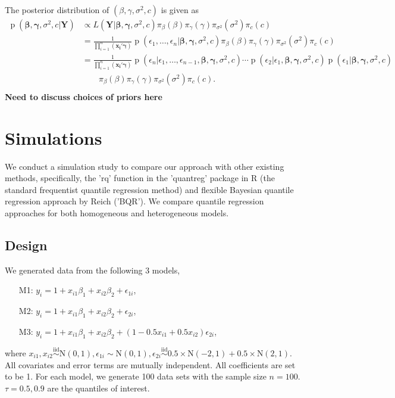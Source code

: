 \documentclass[12pt]{article}
\DeclareMathOperator{\pr}{p}
\begin{document}
The posterior distribution of $(\beta,
\gamma, \sigma^2, c)$ is given as
\begin{align*}
  \pr(\bm{\beta}, \bm{\gamma}, \sigma^2, c|\bm{Y}) & \propto L(\bm{Y}|
  \bm{\beta}, \bm{\gamma}, \sigma^2, c) \pi_{\beta}(\beta)
  \pi_{\gamma}(\gamma) \pi_{\sigma^2}(\sigma^2) \pi_c(c) \\
  & = \frac{1}{\prod_{i=1}^n (\bm{x_i'\gamma})} \pr \left( \epsilon_1,
    \ldots, \epsilon_n | \bm{\beta}, \bm{\gamma}, \sigma^2, c\right)
  \pi_{\beta}(\beta)
  \pi_{\gamma}(\gamma) \pi_{\sigma^2}(\sigma^2) \pi_c(c) \\
  & = \frac{1}{\prod_{i=1}^n (\bm{x_i'\gamma})} \pr \left(\epsilon_n| \epsilon_1,
    \ldots, \epsilon_{n-1} , \bm{\beta}, \bm{\gamma}, \sigma^2, c\right)
  \cdots  \pr \left(\epsilon_2| \epsilon_1, \bm{\beta}, \bm{\gamma},
    \sigma^2, c\right)  \pr \left(\epsilon_1| \bm{\beta}, \bm{\gamma},
    \sigma^2, c\right)\\
  & \qquad 
  \pi_{\beta}(\beta)
  \pi_{\gamma}(\gamma) \pi_{\sigma^2}(\sigma^2) \pi_c(c) .\\
\end{align*}
{\bf Need to discuss choices of priors here}

\section{Simulations}
We
conduct a simulation study to compare our approach with other existing
methods, specifically, the 'rq' function in the 'quantreg' package in
R 
(the standard frequentist quantile regression method) and 
flexible Bayesian quantile regression approach by Reich
('BQR'). 
We compare quantile regression approaches
for both homogeneous and heterogeneous models. 

\subsection{Design}
We generated data from the following 3 models,
\begin{itemize}
\item [M1:] $y_i = 1 + x_{i1}\beta_1 + x_{i2}\beta_2 + \epsilon_{1i}$,
\item [M2:] $y_i = 1 + x_{i1}\beta_1 + x_{i2}\beta_2 + \epsilon_{2i}$,
\item [M3:]  $y_i = 1 + x_{i1}\beta_1 + x_{i2}\beta_2 +
  (1-0.5x_{i1}+0.5x_{i2}) \epsilon_{2i}$, 
\end{itemize}
where $x_{i1} , x_{i2} \stackrel{\text{iid}}{\sim} \mathrm{N}(0,1),
\epsilon_{1i} \sim \mathrm{N}(0,1), \epsilon_{2i} 
\stackrel{\text{iid}}{\sim} 0.5 \times \mathrm{N}(-2,1) + 
0.5 \times \mathrm{N}(2,1)
$. All covariates and error terms are mutually independent. All
coefficients are set to be 1. For each model, we generate 100 data
sets with the sample size $n=100$. $\tau=0.5, 0.9$ are the quantiles
of interest.  
\end{document}

